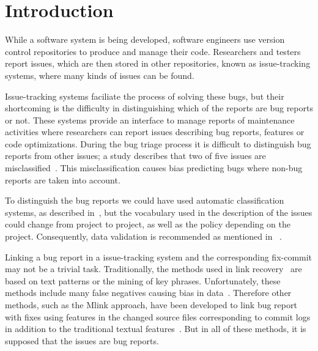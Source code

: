 \documentclass[runningheads,a4paper]{llncs}
\begin{document}
\section{Introduction}

While a software system is being developed, software engineers use version control repositories to produce and manage their code. Researchers and testers report issues, which are then stored in other repositories, known as issue-tracking systems, where many kinds of issues can be found.

Issue-tracking systems faciliate the process of solving these bugs, but their shortcoming is the difficulty in distinguishing which of the reports are bug reports or not. These systems provide an interface to manage reports of maintenance activities where researchers can report issues describing bug reports, features or code optimizations. During the bug triage process it is difficult to distinguish bug reports from other issues; a study describes that two of five issues are misclassified~\cite{Herzig}. This misclassification causes bias predicting bugs where non-bug reports are taken into account.

To distinguish the bug reports we could have used automatic classification systems, as described in~\cite{Antoniol}, but the vocabulary used in the description of the issues could change from project to project, as well as the policy depending on the project. Consequently, data validation is recommended as mentioned in ~\cite{Herzig}.

Linking a bug report in a issue-tracking system and the corresponding fix-commit may not be a trivial task. Traditionally, the methods used in link recovery~\cite{Zimmermann,Thomas} are based on text patterns or the mining of key phrases. Unfortunately, these methods include many false negatives causing bias in data~\cite{Bird,NguyenTH}. Therefore other methods, such as the Mlink approach, have been developed to link bug report with fixes using features in the changed source files corresponding to commit logs in addition to the traditional textual features~\cite{Nguyen}. But in all of these methods, it is supposed that the issues are bug reports.
\end{document}

